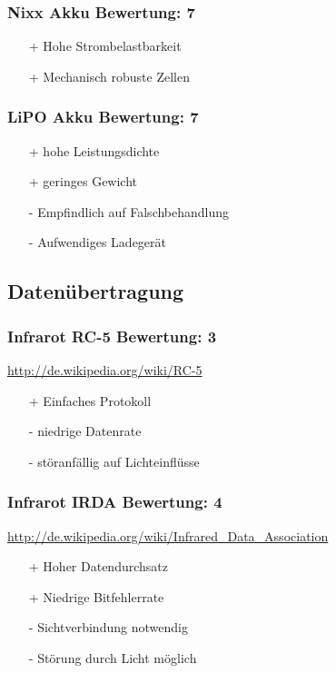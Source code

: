\subsubsection{Nixx Akku \hfill Bewertung: 7}
\begin{itemize}
    \item[+] Hohe Strombelastbarkeit
    \item[+] Mechanisch robuste Zellen
\end{itemize}

\subsubsection{LiPO Akku \hfill Bewertung: 7}
\begin{itemize}
    \item[+] hohe Leistungsdichte
    \item[+] geringes Gewicht
    \item[-] Empfindlich auf Falschbehandlung
    \item[-] Aufwendiges Ladegerät
\end{itemize}

\subsection{Datenübertragung}

\subsubsection{Infrarot RC-5 \hfill Bewertung: 3}
\url{http://de.wikipedia.org/wiki/RC-5}
\begin{itemize}
    \item[+] Einfaches Protokoll
    \item[-] niedrige Datenrate
    \item[-] störanfällig auf Lichteinflüsse
\end{itemize}

\subsubsection{Infrarot IRDA \hfill Bewertung: 4}
\url{http://de.wikipedia.org/wiki/Infrared_Data_Association}
\begin{itemize}
    \item[+] Hoher Datendurchsatz
    \item[+] Niedrige Bitfehlerrate
    \item[-] Sichtverbindung notwendig
    \item[-] Störung durch Licht möglich
\end{itemize}


